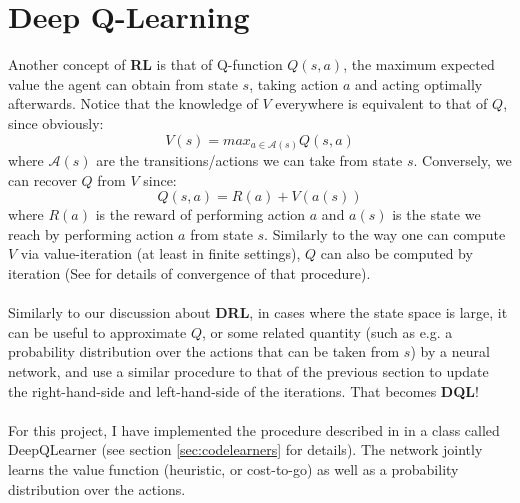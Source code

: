 
\section{Deep Q-Learning}

Another concept of \textbf{RL} is that of Q-function $Q(s, a)$, the maximum expected value the agent can obtain from state $s$, taking action $a$ and acting optimally afterwards. Notice that the knowledge of $V$ everywhere is equivalent to that of $Q$, since obviously:
\begin{equation} \label{eq:QI}
V(s) = max_{a \in \mathcal{A}(s)} Q(s, a)
\end{equation}
where $\mathcal{A}(s)$ are the transitions/actions we can take from state $s$. Conversely, we can recover $Q$ from $V$ since:
\begin{equation} \label{eq:QI2}
Q(s, a) = R(a) + V(a(s))
\end{equation}
where $R(a)$ is the reward of performing action $a$ and $a(s)$ is the state we reach by performing action $a$ from state $s$. Similarly to the way one can compute $V$ via value-iteration (at least in finite settings), $Q$ can also be computed by iteration (See \cite{Watkins1992} for details of convergence of that procedure).
\\
\\
Similarly to our discussion about \textbf{DRL}, in cases where the state space is large, it can be useful to approximate $Q$, or some related quantity (such as e.g. a probability distribution over the actions that can be taken from $s$) by a neural network, and use a similar procedure to that of the previous section to update the right-hand-side and left-hand-side of the iterations. That becomes \textbf{DQL}!
\\
\\
For this project, I have implemented the procedure described in \cite{https://doi.org/10.48550/arxiv.1805.07470} in a class called DeepQLearner (see section \ref{sec:codelearners} for details). The network jointly learns the value function (heuristic, or cost-to-go) as well as a probability distribution over the actions.


